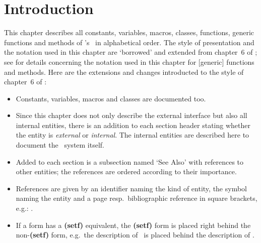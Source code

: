 %
%


\pagestyle{headings}
\ifx\mytocdepth\undefined\relax\else%
\settocdepth{\mytocdepth}%
\fi%
\ifx\notableofcontents\undefined%
\tableofcontents\clearpage%
\thispagestyle{plain}\cleardoublepage%
\listoffigures%
\fi%
\clearpage\thispagestyle{plain}\cleardoublepage%

%

\BetterSloppy

\chapter{Introduction}

This chapter describes all constants, variables, macros, classes,
functions, generic functions and methods of
\plob\ifx\thistitle\undefined\relax\else{}'{}s \thistitle\fi\ in
alphabetical order. The style of presentation and the notation used in
this chapter are `borrowed' and extended from chapter~6 of
\cite{bib:AMOP}; see \cite[]{bib:AMOP} for details
concerning the notation used in this chapter for [generic] functions
and methods.  Here are the extensions and changes introducted to the
style of chapter~6 of \cite{bib:AMOP}:
\begin{itemize}
\item Constants, variables, macros and classes are documented too.
\item Since this chapter does not only describe the external interface
  but also all internal entities, there is an addition to each section
  header stating whether the entity is {\it external} or {\it
    internal}.  The internal entities are described here to document
  the \plob\ system itself.
\item Added to each section is a subsection named `{\sc See Also}'
  with references to other entities; the references are ordered
  according to their importance.
\item References are given by an identifier naming the kind of entity,
  the symbol naming the entity and a page resp.\ bibliographic
  reference in square brackets, e.g.: .
\item If a form has a {\bf (setf)} equivalent, the {\bf(setf)} form is
  placed right behind the non-{\bf(setf)} form, e.g.\ the description
  of \ is placed behind the description of
  .
\end{itemize}

